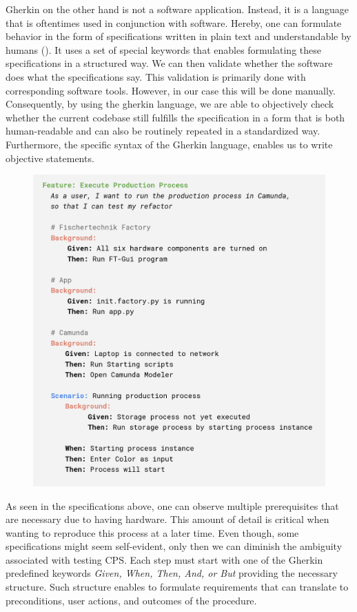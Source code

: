 Gherkin on the other hand is not a software application. Instead, it is a language that is oftentimes used in conjunction with software. Hereby, one can formulate behavior in the form of specifications written in plain text and understandable by humans (\cite{cucumber-reference}). It uses a set of special keywords that enables formulating these specifications in a structured way. We can then validate whether the software does what the specifications say. This validation is primarily done with corresponding software tools. However, in our case this will be done manually. Consequently, by using the gherkin language, we are able to objectively check whether the current codebase still fulfills the specification in a form that is both human-readable and can also be routinely repeated in a standardized way.  Furthermore, the specific syntax of the Gherkin language, enables us to write objective statements.

\newpage
{}
\begin{figure}[H]
	\centering
    \includegraphics[width=\textwidth]{./assets/gherkin_border}
\end{figure}

As seen in the specifications above, one can observe multiple prerequisites that are necessary due to having hardware. This amount of detail is critical when wanting to reproduce this process at a later time. Even though, some specifications might seem self-evident, only then we can diminish the ambiguity associated with testing CPS. Each step must start with one of the Gherkin predefined keywords \emph{Given, When, Then, And, or But} providing the necessary structure. Such structure enables to formulate requirements that can translate to preconditions, user actions, and outcomes of the procedure.

